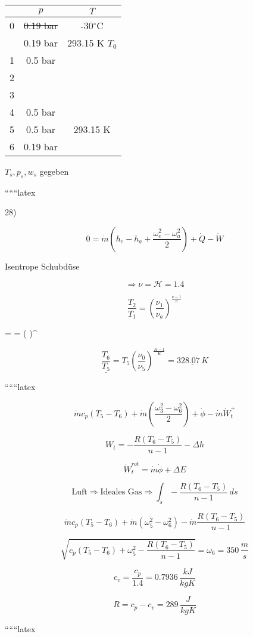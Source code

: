 \begin{tabular}{|c|c|c|}
\hline
 & $p$ & $T$ \\
\hline
0 & \sout{0.19 bar} & -30$^\circ$C \\
  & 0.19 bar & 293.15 K $T_0$ \\
\hline
1 & 0.5 bar & \\
\hline
2 & & \\
\hline
3 & \sout{} & \\
\hline
4 & 0.5 bar & \\
\hline
5 & 0.5 bar & 293.15 K \\
\hline
6 & 0.19 bar & \\
\hline
\end{tabular}

\vspace{1cm}

$T_s, p_s, w_s$ gegeben

``````latex

28)

\[
0 = \dot{m}(h_e - h_a + \frac{\omega_e^2 - \omega_a^2}{2}) + \dot{Q} - \dot{W}
\]

Isentrope Schubdüse

\[
\Rightarrow \nu = \mathcal{H} = 1.4
\]

\[
\frac{T_2}{T_1} = \left( \frac{\nu_1}{\nu_a} \right)^{\frac{\nu - 1}{\nu}}
\]

 =  = \left(  \right)^{}

\[
\frac{T_6}{\underline{T_5}} = T_5 \left( \frac{\nu_0}{\nu_5} \right)^{\frac{K - 1}{K}} = \underline{328.07 \, K}
\]

``````latex


\[
\dot{m} c_p (T_5 - T_6) + \dot{m} \left( \frac{\omega_3^2 - \omega_6^2}{2} \right) + \dot{\phi} - \dot{m} \dot{W}_t^+
\]

\[
W_t = -\frac{R(T_6 - T_5)}{n - 1} - \Delta h
\]

\[
\dot{W}_t^{rot} = \dot{m} \dot{\phi} + \Delta E
\]

\[
\text{Luft} \Rightarrow \text{Ideales Gas} \Rightarrow \int_{s} - \frac{R(T_6 - T_5)}{n - 1} \, ds
\]

\[
\dot{m} c_p (T_5 - T_6) + \dot{m} (\omega_5^2 - \omega_6^2) - \dot{m} \frac{R(T_6 - T_5)}{n - 1}
\]

\[
\sqrt{c_p (T_5 - T_6) + \omega_5^2 - \frac{R(T_6 - T_5)}{n - 1}} = \omega_6 = 350 \, \frac{m}{s}
\]

\[
c_v = \frac{c_p}{1.4} = 0.7936 \, \frac{kJ}{kgK}
\]

\[
R = c_p - c_v = 289 \, \frac{J}{kgK}
\]

``````latex